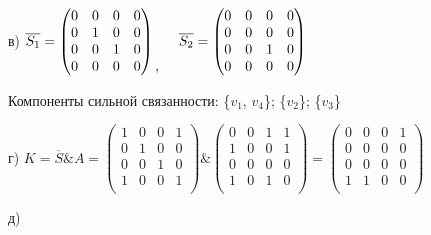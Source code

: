 \documentclass{article}
\begin{document}
в) $\overline{S_1} = \begin{pmatrix}
	0 & 0 & 0 & 0\\
	0 & 1 & 0 & 0\\
	0 & 0 & 1 & 0\\
	0 & 0 & 0 & 0\\
\end{pmatrix}
\begin{matrix} \\ \\ \\,\end{matrix} 
\hspace{5mm} \overline{S_2} = \begin{pmatrix}
	0 & 0 & 0 & 0\\
	0 & 0 & 0 & 0\\
	0 & 0 & 1 & 0\\
	0 & 0 & 0 & 0\\
\end{pmatrix}$ 
\vspace{5mm}
\par
Компоненты сильной связанности: \{$v_1$, $v_4$\}; \{$v_2$\}; \{$v_3$\}
\vspace{5mm}
\par
г) $ K = \overline{S} \& A = \begin{pmatrix}
	1 & 0 & 0 & 1\\
	0 & 1 & 0 & 0\\
	0 & 0 & 1 & 0\\
	1 & 0 & 0 & 1\\
\end{pmatrix} \& 
\begin{pmatrix}
	0 & 0 & 1 & 1\\
	1 & 0 & 0 & 1\\
	0 & 0 & 0 & 0\\
	1 & 0 & 1 & 0\\
\end{pmatrix} = 
\begin{pmatrix}
	0 & 0 & 0 & 1\\
	0 & 0 & 0 & 0\\
	0 & 0 & 0 & 0\\
	1 & 1 & 0 & 0\\
\end{pmatrix}$
\vspace{5mm}
\par
д) \par{}
\end{document}
